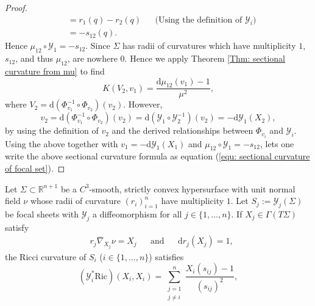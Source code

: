 \documentclass[12pt]{amsart}
\theoremstyle{plain}
\newenvironment{Mainthm}[1]{%
  \IfBlankTF{#1}
    {\renewcommand{\theMainthminner}{\unskip}}
    {\renewcommand\theMainthminner{#1}}%
  \Mainthminner
}{\endMainthminner}
\theoremstyle{definition}
\def\R{\mathbb{R}}
\newcommand{\td}{\mathrm{d}}
\numberwithin{equation}{section}
\begin{document}
\begin{proof}
\begin{align*}
&=r_1(q)-r_2(q) &&\text{(Using the definition of $\mathcal{Y}_i$)}\\
&=-s_{12}(q).
\end{align*}
Hence $\mu_{12}\circ\mathcal{Y}_1=-s_{12}$. Since $\Sigma$ has radii of curvatures which have multiplicity $1$, $s_{12}$, and thus $\mu_{12}$, are nowhere $0$. Hence we apply Theorem \ref{Thm: sectional curvature from mu} to find
\[
    K(V_2,v_1)=\frac{\td\mu_{12}(v_1)-1}{\mu^2},
\]
where $V_2=\td(\Phi^{-1}_{v_1}\circ\Phi_{v_2})(v_2)$. However, 
\[
v_2=\td(\Phi^{-1}_{v_1}\circ\Phi_{v_2})(v_2)=\td(\mathcal{Y}_1\circ\mathcal{Y}^{-1}_2)(v_2)=-\td \mathcal{Y}_1(X_2),
\]
by using the definition of $v_2$ and the derived relationships between $\Phi_{v_i}$ and $\mathcal{Y}_i$. Using the above together with $v_1=-\td\mathcal{Y}_1(X_1)$ and $\mu_{12}\circ\mathcal{Y}_1=-s_{12}$, lets one write the above sectional curvature formula as equation (\ref{equ: sectional curvature of focal set}).
\end{proof}
\begin{Mainthm}{3}\label{Thm: focal set of hypersurf}
    Let $\Sigma\subset \R^{n+1}$ be a $C^3$-smooth, strictly convex hypersurface with unit normal field $\nu$ whose radii of curvature $(r_i)_{i=1}^n$ have multiplicity $1$. Let $S_j:=\mathcal{Y}_j(\Sigma)$ be focal sheets with $\mathcal{Y}_j$ a diffeomorphism for all $j\in\{1,\ldots,n\}$. If $X_j\in\Gamma(T\Sigma)$ satisfy
    \begin{align*}
       &r_j\overline{\nabla}_{X_j}\nu =X_j &&\text{and} &&\td r_j(X_j)=1,
    \end{align*}
    the Ricci curvature of $S_i$ ($i\in\{1,\ldots,n\}$) satisfies
    \[
    (\mathcal{Y}_i^\ast\mathrm{Ric})(X_i,X_i)=\sum_{\substack{j=1\\j\neq i}}^n\frac{X_i(s_{ij})-1}{(s_{ij})^2},
    \]
\end{Mainthm}
\end{document}
